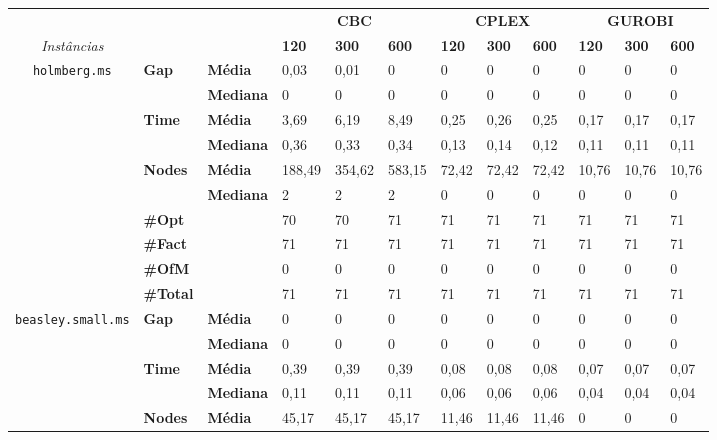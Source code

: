 \documentclass[]{article}
\begin{document}
\begin{table}[]
\begin{adjustbox}{angle=90}
\begin{tabular}{cll|lll|lll|lll}
& & & \multicolumn{3}{c}{\textbf{CBC}} & \multicolumn{3}{c}{\textbf{CPLEX}} & \multicolumn{3}{c}{\textbf{GUROBI}} 	\\\textit{Instâncias} & & & \textbf{120} & \textbf{300} & \textbf{600} & \textbf{120} & \textbf{300} & \textbf{600} & \textbf{120} & \textbf{300} & \textbf{600} \\
\hline
\multirow{7}{*}{\texttt{holmberg.ms}} & \multirow{2}{*}{\textbf{Gap}} & \textbf{Média} & 0,03 & 0,01 & 0 & 0 & 0 & 0 & 0 & 0 & 0 \\
& & \textbf{Mediana} & 0 & 0 & 0 & 0 & 0 & 0 & 0 & 0 & 0 \\
\cline{2-12}
& \multirow{2}{*}{\textbf{Time}} & \textbf{Média} & 3,69 & 6,19 & 8,49 & 0,25 & 0,26 & 0,25 & 0,17 & 0,17 & 0,17 \\
& & \textbf{Mediana} & 0,36 & 0,33 & 0,34 & 0,13 & 0,14 & 0,12 & 0,11 & 0,11 & 0,11 \\
\cline{2-12}
& \multirow{2}{*}{\textbf{Nodes}} & \textbf{Média} & 188,49 & 354,62 & 583,15 & 72,42 & 72,42 & 72,42 & 10,76 & 10,76 & 10,76 \\
& & \textbf{Mediana} & 2 & 2 & 2 & 0 & 0 & 0 & 0 & 0 & 0 \\
\cline{2-12}
& \textbf{\#Opt} & & 70 & 70 & 71 & 71 & 71 & 71 & 71 & 71 & 71 \\
& \textbf{\#Fact} & & 71 & 71 & 71 & 71 & 71 & 71 & 71 & 71 & 71 \\
& \textbf{\#OfM} & & 0 & 0 & 0 & 0 & 0 & 0 & 0 & 0 & 0 \\
& \textbf{\#Total} & & 71 & 71 & 71 & 71 & 71 & 71 & 71 & 71 & 71 \\
\hline
\multirow{7}{*}{\texttt{beasley.small.ms}} & \multirow{2}{*}{\textbf{Gap}} & \textbf{Média} & 0 & 0 & 0 & 0 & 0 & 0 & 0 & 0 & 0 \\
& & \textbf{Mediana} & 0 & 0 & 0 & 0 & 0 & 0 & 0 & 0 & 0 \\
\cline{2-12}
& \multirow{2}{*}{\textbf{Time}} & \textbf{Média} & 0,39 & 0,39 & 0,39 & 0,08 & 0,08 & 0,08 & 0,07 & 0,07 & 0,07 \\
& & \textbf{Mediana} & 0,11 & 0,11 & 0,11 & 0,06 & 0,06 & 0,06 & 0,04 & 0,04 & 0,04 \\
\cline{2-12}
& \multirow{2}{*}{\textbf{Nodes}} & \textbf{Média} & 45,17 & 45,17 & 45,17 & 11,46 & 11,46 & 11,46 & 0 & 0 & 0 \\

\end{tabular}
\end{adjustbox}
\end{table}
\end{document}
